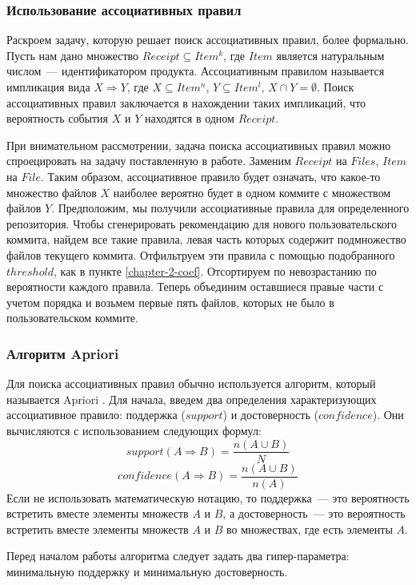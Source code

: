     \subsubsection{Использование ассоциативных правил}
Раскроем задачу, которую решает поиск ассоциативных правил, более формально. Пусть нам дано множество $Receipt \subseteq Item^k$, где $Item$ является натуральным числом~--- идентификатором продукта. Ассоциативным правилом называется импликация вида $X \Rightarrow Y$, где $X \subseteq Item^n$, $Y \subseteq Item^l$, $X \cap Y = \emptyset$. Поиск ассоциативных правил заключается в нахождении таких импликаций, что вероятность события $X$ и $Y$ находятся в одном $Receipt$. 

При внимательном рассмотрении, задача поиска ассоциативных правил можно спроецировать на задачу поставленную в работе. Заменим $Receipt$ на $Files$, $Item$ на $File$. Таким образом, ассоциативное правило будет означать, что какое-то множество файлов $X$ наиболее вероятно будет в одном коммите с множеством файлов $Y$. Предположим, мы получили ассоциативные правила для определенного репозитория. Чтобы сгенерировать рекомендацию для нового пользовательского коммита, найдем все такие правила, левая часть которых содержит подмножество файлов текущего коммита. Отфильтруем эти правила с помощью подобранного $threshold$, как в пункте \ref{chapter-2-coef}. Отсортируем по невозрастанию по вероятности каждого правила. Теперь объединим оставшиеся правые части с учетом порядка и возьмем первые пять файлов, которых не было в пользовательском коммите.
        \subsubsection{Алгоритм Apriori}\label{chapter2-apriori}
Для поиска ассоциативных правил обычно используется алгоритм, который называется Apriori \cite{apriori}. Для начала, введем два определения характеризующих ассоциативное правило: поддержка ($support$) и достоверность ($confidence$). Они вычисляются с использованием следующих формул:
    $$support(A \Rightarrow B) = \frac{n(A \cup B)}{N}$$
    $$confidence(A \Rightarrow B) = \frac{n(A \cup B)}{n(A)}$$
Если не использовать математическую нотацию, то поддержка~--- это вероятность встретить вместе элементы множеств $A$ и $B$, а достоверность~--- это вероятность встретить вместе элементы множеств $A$ и $B$ во множествах, где есть элементы $A$.

Перед началом работы алгоритма следует задать два гипер-параметра: минимальную поддержку и минимальную достоверность. 


